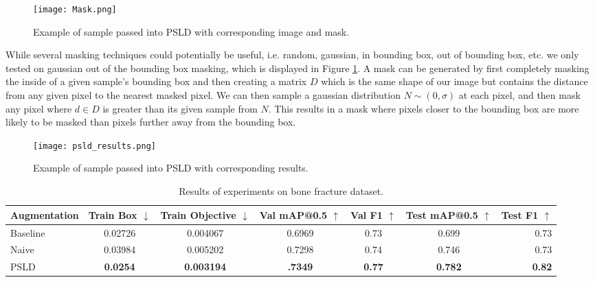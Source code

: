 \documentclass{article}
\begin{document}
\begin{figure}[ht]
    \vskip -0.1in
    \begin{center}
        \centerline{\texttt{[image: Mask.png]}}
        \caption{Example of sample passed into PSLD with corresponding image and mask.}
        \label{psld_mask}
    \end{center}
    \vskip -0.3in
\end{figure}

While several masking techniques could potentially be useful, i.e. random, gaussian, in bounding box, out of bounding box, etc. we only tested on
gaussian out of the bounding box masking, which is displayed in Figure \ref{psld_mask}. A mask can be generated by first completely masking the inside 
of a given sample's bounding box and then creating 
a matrix $D$ which is the same shape of our image but contains the distance from any given pixel to the nearest masked pixel. We can then sample a gaussian
distribution $N \sim (0, \sigma)$ at each pixel, and then mask any pixel where $d \in D$ is greater than its given sample from $N$. This results in a mask where pixels
closer to the bounding box are more likely to be masked than pixels further away from the bounding box. 

\begin{figure}[ht]
    \vskip -0.1in
    \begin{center}
        \centerline{\texttt{[image: psld\_results.png]}}
        \caption{Example of sample passed into PSLD with corresponding results.}
        \label{psld_results}
    \end{center}
    \vskip -0.3in
\end{figure}


\begin{table*}[ht!]
\centering
\caption{Results of experiments on bone fracture dataset.}
\label{results}
\begin{tabular}{lcccccr}
\toprule
Augmentation & Train Box $\downarrow$ & Train Objective $\downarrow$ & Val mAP@0.5 $\uparrow$ & Val F1  $\uparrow$ & Test mAP@0.5 $\uparrow$ & Test F1 $\uparrow$\\
\midrule
Baseline & 0.02726 & 0.004067 & 0.6969 & 0.73 & 0.699 & 0.73\\
Naive &  0.03984 & 0.005202 & 0.7298 & 0.74 & 0.746 & 0.73\\
PSLD & \textbf{0.0254} & \textbf{0.003194} & \textbf{.7349} &  \textbf{0.77} & \textbf{0.782} & \textbf{0.82} \\
\bottomrule
\end{tabular}
\end{table*}
\end{document}
